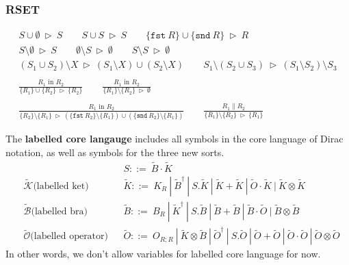\documentclass[manuscript, review, timestamp]{acmart}
\newcommand*{\fst}{\texttt{fst}}
\newcommand*{\snd}{\texttt{snd}}
\newcommand*{\reduce}{\ \triangleright\ }
\begin{document}
\subsubsection*{\textsf{RSET}}
\begin{gather*}
  S \cup \emptyset \reduce S
  \qquad
  S \cup S \reduce S
  \qquad
  \{ \fst\ R \} \cup \{ \snd\ R \} \reduce R \\
  S \setminus \emptyset \reduce S
  \qquad
  \emptyset \setminus S \reduce \emptyset
  \qquad
  S \setminus S \reduce \emptyset \\
  (S_1 \cup S_2) \setminus X \reduce (S_1 \setminus X) \cup (S_2 \setminus X)
  \qquad
  S_1 \setminus (S_2 \cup S_3) \reduce (S_1 \setminus S_2) \setminus S_3 \\
  \\
  \frac{ R_1 \textrm{ in } R_2 }{ \{ R_1 \} \cup \{ R_2 \} \reduce \{ R_2 \} }
  \qquad
  \frac{ R_1 \textrm{ in } R_2 }{ \{ R_1 \} \setminus \{ R_2 \} \reduce \emptyset } \\
  \\
  \frac{ R_1 \textrm{ in } R_2 }{ \{R_2\} \setminus \{R_1\} \reduce (\{\fst\ R_2\} \setminus \{R_1\}) \cup (\{\snd\ R_2\} \setminus \{R_1\})}
  \qquad
  \frac{R_1 \| R_2}{ \{ R_1 \} \setminus \{ R_2 \} \reduce \{ R_1 \}} 
\end{gather*}

\begin{definition}
  The \textbf{labelled core langauge} includes all symbols in the core language of Dirac notation, as well as symbols for the three new sorts.
  \begin{align*}
    & && S ::=\ \tilde{B} \cdot \tilde{K} \\
    & \tilde{\mathcal{K}}\text{(labelled ket)}&& \tilde{K} ::=\ K_{R}\ |\ \tilde{B}^\dagger\ |\ S.\tilde{K}\ |\ \tilde{K} + \tilde{K}\ |\ \tilde{O} \cdot \tilde{K}\ |\ \tilde{K} \otimes \tilde{K} \\
    & \tilde{\mathcal{B}}\text{(labelled bra)} && \tilde{B} ::=\ B_{R}\ |\ \tilde{K}^\dagger\ |\ S.\tilde{B}\ |\ \tilde{B} + \tilde{B}\ |\ \tilde{B} \cdot \tilde{O}\ |\ \tilde{B} \otimes \tilde{B} \\
    & \tilde{\mathcal{O}}\text{(labelled operator)} &&\tilde{O} ::=\ O_{R; R}\ |\ \tilde{K}\otimes\tilde{B}\ |\ \tilde{O}^\dagger\ |\ S.\tilde{O}\ |\ \tilde{O} + \tilde{O}\ |\ \tilde{O} \cdot \tilde{O}\ |\ \tilde{O} \otimes \tilde{O}
  \end{align*}
  In other words, we don't allow variables for labelled core language for now.
\end{definition}
\end{document}
